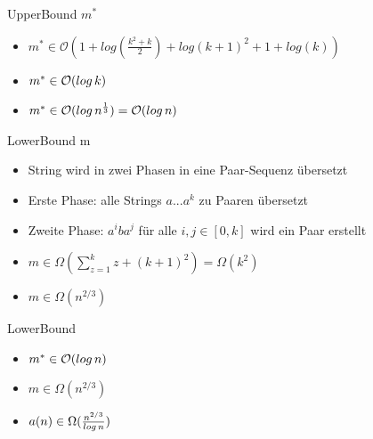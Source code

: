 \documentclass[xcolor=dvipsnames]{beamer}
\begin{document}
\begin{frame}{\FrameName}
\begin{block}{UpperBound $m^*$}
	\begin{center}
	\end{center}
	\begin{itemize}[<+->]
		\item $m^* \in \mathcal{O}(1+ log(\frac{k^2+k}{2}) + log(k+1)^2 + 1+ log(k))$
		\item $m^* \in \mathcal{O}(log \thinspace k)$
		\item $m^* \in \mathcal{O}(log \thinspace n^\frac{1}{3}) = \mathcal{O}(log \thinspace n)$
	\end{itemize}
\end{block}
\end{frame}

\begin{frame}{\FrameName}
\begin{block}{LowerBound m}
	\begin{center}
	\end{center}
	\begin{itemize}[<+->]
		\item String wird in zwei Phasen in eine Paar-Sequenz übersetzt
		\item Erste Phase: alle Strings $a...a^k$ zu Paaren übersetzt
		\item Zweite Phase: $a^iba^j$ für alle $i,j \in [0,k]$ wird ein Paar erstellt
		\item $m \in \Omega(\sum_{z=1}^k z + (k+1)^2) = \Omega(k^2)$
		\item $m \in \Omega(n^{2/3})$
	\end{itemize}
\end{block}
\end{frame}

\begin{frame}{\FrameName}
\begin{block}{LowerBound}
	\begin{center}
	\end{center}
	\begin{itemize}[<+->]
		\item $m^* \in \mathcal{O}(log \thinspace n)$
		\item $m \in \Omega(n^{2/3})$
		\item $a(n) \in \Omega(\frac{n^{2/3}}{log \thinspace n})$
	\end{itemize}
\end{block}
\end{frame}
\end{document}
